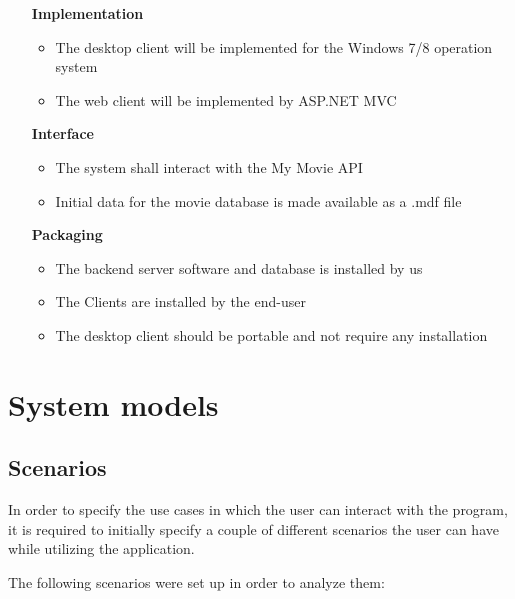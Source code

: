 \begin{itemize}
\vspace{0.2cm}
\item[\textbf{Implementation}]
\begin{itemize}
\item The desktop client will be implemented for the Windows 7/8 operation system
\item The web client will be implemented by ASP.NET MVC
\end{itemize}

\vspace{0.2cm}
\item[\textbf{Interface}]
\begin{itemize}
\item The system shall interact with the My Movie API
\item Initial data for the movie database is made available as a .mdf file
\end{itemize}

\vspace{0.2cm}
\item[\textbf{Packaging}]
\begin{itemize}
\item The backend server software and database is installed by us
\item The Clients are installed by the end-user
\item The desktop client should be portable and not require any installation
\end{itemize}

\end{itemize}


\section{System models}

\subsection{Scenarios}
In order to specify the use cases in which the user can interact with the program, it is required to initially specify a couple of different scenarios the user can have while utilizing the application.

The following scenarios were set up in order to analyze them:

